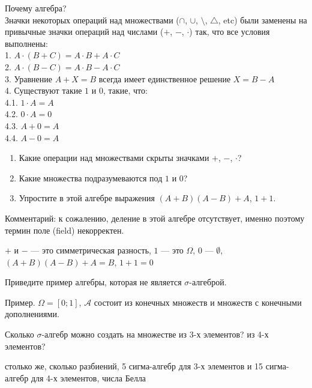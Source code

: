 \begin{problem}
 Почему алгебра? \\
Значки некоторых операций над множествами ($\cap$, $\cup$,
$\setminus$, $\triangle$, etc) были заменены на привычные значки
операций над числами ($+$, $-$, $\cdot$) так, что все условия выполнены: \\
1. $A\cdot(B+C)=A\cdot B+A\cdot C$ \\
2. $A\cdot(B-C)=A\cdot B-A\cdot C$ \\
3. Уравнение $A+X=B$ всегда имеет единственное решение $X=B-A$ \\
4. Существуют такие $1$ и $0$, такие, что: \\
4.1. $1\cdot A=A$ \\
4.2. $0\cdot A=0$ \\
4.3. $A+0=A$ \\
4.4. $A-0=A$
\begin{enumerate}
\item Какие операции над множествами скрыты значками $+$, $-$,
$\cdot$?
\item Какие множества подразумеваются под $1$ и $0$?
\item Упростите в этой алгебре выражения $(A+B)(A-B)+A$, $1+1$.
\end{enumerate}
Комментарий: к сожалению, деление в этой алгебре отсутствует,
именно поэтому термин поле (field) некорректен.

\begin{sol}
$+$ и $-$ — это симметрическая разность, $1$ — это $\Omega$, $0$ — $\emptyset$, $(A+B)(A-B)+A=B$, $1+1=0$
\end{sol}
\end{problem}

\begin{problem}
Приведите пример алгебры, которая не является $\sigma$-алгеброй.

\begin{sol}
Пример. $\Omega=[0;1]$, $\mathcal{A}$ состоит из конечных множеств и множеств с конечными дополнениями.
\end{sol}
\end{problem}

\begin{problem}
Сколько $\sigma$-алгебр можно создать на множестве из 3-х элементов? из 4-х элементов?

\begin{sol}
столько же, сколько разбиений, 5 сигма-алгебр для 3-х элементов и 15 сигма-алгебр для 4-х элементов, числа Белла
\end{sol}
\end{problem}

